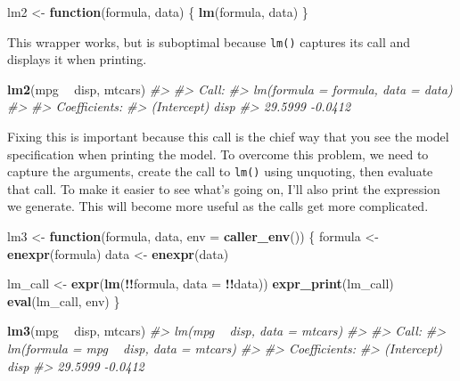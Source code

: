 \documentclass[]{book}
\newenvironment{Shaded}{\begin{snugshade}}{\end{snugshade}}
\newcommand{\CommentTok}[1]{\textcolor[rgb]{0.37,0.37,0.37}{\textit{#1}}}
\newcommand{\ControlFlowTok}[1]{\textcolor[rgb]{0.27,0.27,0.27}{\textbf{#1}}}
\newcommand{\DataTypeTok}[1]{\textcolor[rgb]{0.27,0.27,0.27}{#1}}
\newcommand{\KeywordTok}[1]{\textcolor[rgb]{0.27,0.27,0.27}{\textbf{#1}}}
\newcommand{\NormalTok}[1]{#1}
\newcommand{\OperatorTok}[1]{\textcolor[rgb]{0.43,0.43,0.43}{\textbf{#1}}}
\newcommand{\StringTok}[1]{\textcolor[rgb]{0.5,0.5,0.5}{#1}}
\begin{document}
\begin{Shaded}
\begin{Highlighting}[]
\NormalTok{lm2 <-}\StringTok{ }\ControlFlowTok{function}\NormalTok{(formula, data) \{}
  \KeywordTok{lm}\NormalTok{(formula, data)}
\NormalTok{\}}
\end{Highlighting}
\end{Shaded}

This wrapper works, but is suboptimal because \texttt{lm()} captures its call and displays it when printing.

\begin{Shaded}
\begin{Highlighting}[]
\KeywordTok{lm2}\NormalTok{(mpg }\OperatorTok{~}\StringTok{ }\NormalTok{disp, mtcars)}
\CommentTok{#> }
\CommentTok{#> Call:}
\CommentTok{#> lm(formula = formula, data = data)}
\CommentTok{#> }
\CommentTok{#> Coefficients:}
\CommentTok{#> (Intercept)         disp  }
\CommentTok{#>     29.5999      -0.0412}
\end{Highlighting}
\end{Shaded}

Fixing this is important because this call is the chief way that you see the model specification when printing the model. To overcome this problem, we need to capture the arguments, create the call to \texttt{lm()} using unquoting, then evaluate that call. To make it easier to see what's going on, I'll also print the expression we generate. This will become more useful as the calls get more complicated.

\begin{Shaded}
\begin{Highlighting}[]
\NormalTok{lm3 <-}\StringTok{ }\ControlFlowTok{function}\NormalTok{(formula, data, }\DataTypeTok{env =} \KeywordTok{caller_env}\NormalTok{()) \{}
\NormalTok{  formula <-}\StringTok{ }\KeywordTok{enexpr}\NormalTok{(formula)}
\NormalTok{  data <-}\StringTok{ }\KeywordTok{enexpr}\NormalTok{(data)}

\NormalTok{  lm_call <-}\StringTok{ }\KeywordTok{expr}\NormalTok{(}\KeywordTok{lm}\NormalTok{(}\OperatorTok{!!}\NormalTok{formula, }\DataTypeTok{data =} \OperatorTok{!!}\NormalTok{data))}
  \KeywordTok{expr_print}\NormalTok{(lm_call)}
  \KeywordTok{eval}\NormalTok{(lm_call, env)}
\NormalTok{\}}

\KeywordTok{lm3}\NormalTok{(mpg }\OperatorTok{~}\StringTok{ }\NormalTok{disp, mtcars)}
\CommentTok{#> lm(mpg ~ disp, data = mtcars)}
\CommentTok{#> }
\CommentTok{#> Call:}
\CommentTok{#> lm(formula = mpg ~ disp, data = mtcars)}
\CommentTok{#> }
\CommentTok{#> Coefficients:}
\CommentTok{#> (Intercept)         disp  }
\CommentTok{#>     29.5999      -0.0412}
\end{Highlighting}
\end{Shaded}
\end{document}
